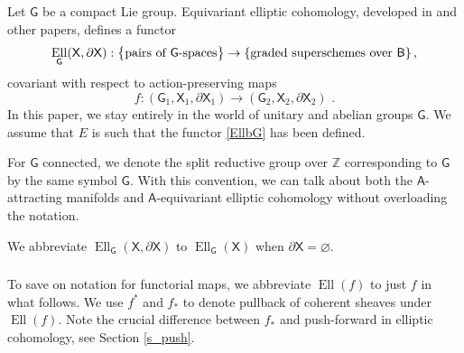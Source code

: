 \documentclass[14pt]{extarticle}
\newcommand{\task}[1]{\bigskip\noindent
  \boxed{\texttt{#1}}\bigskip}
\newcommand{\C}{\mathbb{C}}
\newcommand{\Z}{\mathbb{Z}}
\newcommand{\bT}{\mathsf{T}}
\newcommand{\bA}{\mathsf{A}}
\newcommand{\bG}{\mathsf{G}}
\newcommand{\bB}{\mathsf{B}}
\newcommand{\bX}{\mathsf{X}}
\newcommand{\bP}{\mathbb{P}}
\DeclareMathOperator{\Ell}{Ell}
\theoremstyle{definition}
\begin{document}
\subsubsection{}\label{s_funct} 


Let $\bG$ be a compact Lie group. Equivariant elliptic cohomology, developed in 
\cites{Groj,GKV,Rosu,Lurie,Gepner,Ganter} and other papers, defines a
functor
%
\begin{equation}
\Ell_\bG(\bX,\partial \bX) : 
\big\{ \textup{pairs of $\bG$-spaces} \big\} \to \{\textup{graded superschemes
  over $\bB$}\} \,,\label{EllbG}
\end{equation}
%
covariant with respect to action-preserving maps
%
\begin{equation}
f: (\bG_1, \bX_1,\partial \bX_1) \to (\bG_2, \bX_2,\partial \bX_2)  \, \label{map_pairs} \,. 
\end{equation}
%
In this paper, we stay entirely in the world of unitary and
abelian groups $\bG$. We assume that $E$ is such that the functor
\eqref{EllbG} has been defined.


For $\bG$ connected, we denote the split reductive group over $\Z$ corresponding to $\bG$ 
by the same symbol $\bG$. With this convention, we can talk about both
the $\bA$-attracting manifolds and $\bA$-equivariant elliptic
cohomology without overloading the notation.

We abbreviate $\Ell_\bG(\bX,\partial \bX)$ to $\Ell_\bG(\bX)$ when $\partial
\bX = \varnothing$. 

\subsubsection{} 




To save on notation for functorial maps, we abbreviate $\Ell(f)$ to
just $f$ in what follows. We use $f^*$ and $f_*$ to denote pullback of coherent
sheaves under $\Ell(f)$.
Note the crucial difference between $f_*$ and push-forward in elliptic
cohomology, see Section \ref{s_push}. 


\end{document}
